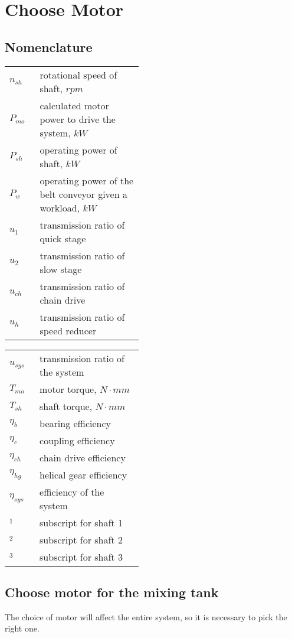 \chapter{Choose Motor}

\section*{Nomenclature}
\begin{tabular}[t]{p{0.05\linewidth}p{0.4\linewidth}}
	$ n_{sh} $ & rotational speed of shaft, $ \unit{rpm} $\\
	$ P_{mo} $ & calculated motor power to drive the system, $ \unit{kW} $\\
	$ P_{sh} $ & operating power of shaft, $ \unit{kW} $\\
	$ P_w $ & operating power of the belt conveyor given a workload, $ \unit{kW} $\\
	$ u_1 $ & transmission ratio of quick stage\\
	$ u_2 $ & transmission ratio of slow stage\\
	$ u_{ch} $ & transmission ratio of chain drive\\
	$ u_{h} $ & transmission ratio of speed reducer
\end{tabular}
\begin{tabular}[t]{p{0.05\linewidth}p{0.4\linewidth}}
	$ u_{sys} $ & transmission ratio of the system\\
	$ T_{mo} $ & motor torque, $ \unit{N\cdot mm} $\\
	$ T_{sh} $ & shaft torque, $ \unit{N\cdot mm} $\\
	$ \eta_b $ & bearing efficiency\\
	$ \eta_c $ & coupling efficiency\\
	$ \eta_{ch} $ & chain drive efficiency\\
	$ \eta_{hg} $ & helical gear efficiency\\
	$ \eta_{sys} $ & efficiency of the system\\
	$ _1 $ & subscript for shaft 1\\
	$ _2 $ & subscript for shaft 2\\
	$ _3 $ & subscript for shaft 3
\end{tabular}

\section{Choose motor for the mixing tank}
The choice of motor will affect the entire system, so it is necessary to pick the right one.


